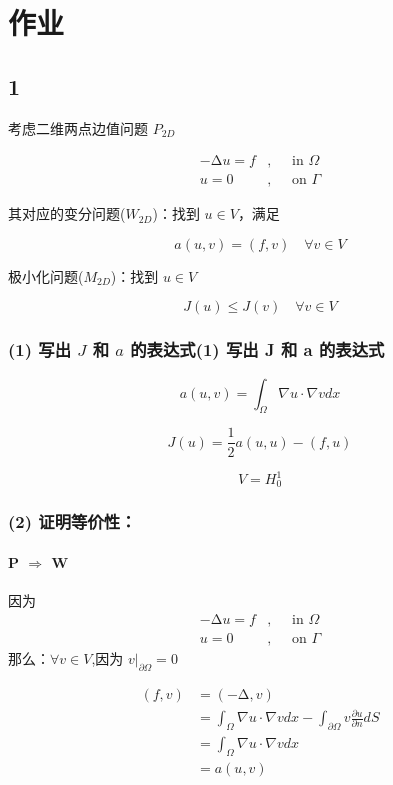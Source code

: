 \documentclass[UTF8]{ctexart}
\begin{document}
\section{作业}

\subsection{1}

考虑二维两点边值问题 \(P_{2D}\)

\[\begin{aligned}
 - \mathrm{\Delta}u = f & ,\quad\text{ in }\Omega \\
u = 0 & ,\quad\text{ on }\Gamma
\end{aligned}\]

其对应的变分问题(\(W_{2D}\))：找到 \(u \in V\)，满足

\[a(u,v) = (f,v)\quad\forall v \in V\]

极小化问题(\(M_{2D}\))：找到 \(u \in V\)

\[J(u) \leq J(v)\quad\forall v \in V\]

\subsubsection{{(1) 写出 \(J\) 和 \(a\)
的表达式}{(1) 写出 J 和 a 的表达式}}

\[a(u,v) = \int_{\Omega}\nabla u \cdot \nabla vdx\]

\[J(u) = \frac{1}{2}a(u,u) - (f,u)\]

\[V = H_{0}^{1}\]

\subsubsection{(2) 证明等价性：}

\paragraph{{P \(\Rightarrow\)
W}}

因为 \[\begin{aligned}
 - \mathrm{\Delta}u = f & ,\quad\text{ in }\Omega \\
u = 0 & ,\quad\text{ on }\Gamma
\end{aligned}\] 那么：\(\forall v \in V\),因为
\(v|_{\partial\Omega} = 0\)

\[\begin{aligned}
(f,v) & = ( - \mathrm{\Delta},v) \\
 & = \int_{\Omega}\nabla u \cdot \nabla vdx - \int_{\partial\Omega}v\frac{\partial u}{\partial n}dS \\
 & = \int_{\Omega}\nabla u \cdot \nabla vdx \\
 & = a(u,v)
\end{aligned}\]
\end{document}
